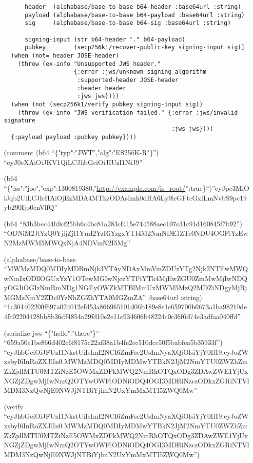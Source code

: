 \documentclass[
]{article}
\begin{document}
\begin{verbatim}
      header  (alphabase/base-to-base b64-header :base64url :string) 
      payload (alphabase/base-to-base b64-payload :base64url :string) 
      sig     (alphabase/base-to-base b64-sig :base64url :string) 

      signing-input (str b64-header "." b64-payload) 
      pubkey        (secp256k1/recover-public-key signing-input sig)] 
  (when (not= header JOSE-header) 
    (throw (ex-info "Unsupported JWS header." 
                    {:error :jws/unknown-signing-algorithm 
                     :supported-header JOSE-header 
                     :header header 
                     :jws jws}))) 
  (when (not (secp256k1/verify pubkey signing-input sig)) 
    (throw (ex-info "JWS verification failed." {:error :jws/invalid-signature 
                                                :jws jws}))) 
  {:payload payload :pubkey pubkey}))) 
\end{verbatim}

(comment (b64 ``\{"typ":"JWT","alg":"ES256K-R"\}'')
``eyJ0eXAiOiJKV1QiLCJhbGciOiJIUzI1NiJ9''

(b64
``\{"iss":"joe","exp":1300819380,"\url{http://example.com/is_root/}'':true\}``)''eyJpc3MiOiJqb2UiLCJleHAiOjEzMDA4MTkzODAsImh0dHA6Ly9leGFtcGxlLmNvbS9pc19yb290Ijp0cnVlfQ''

(b64
``83b3bec44b9cf25bb6c4bc81a283cf415e744588aec107c31c91d160845f7b92'')
``ODNiM2JlYzQ0YjljZjI1YmI2YzRiYzgxYTI4M2NmNDE1ZTc0NDU4OGFlYzEwN2MzMWM5MWQxNjA4NDVmN2I5Mg''

(alphabase/base-to-base
``MWMzMDQ0MDIyMDBmNjk3YTAyNDAxMmVmZDUzYTg2Njk2NTEwMWQwNmIxODllOGUxYzY1OTcwMGIwNjczYTFiYTk4MjEwZGU0ZmMwMjIwNDQyOGJiOGIzNmRmNDg1NGEyOWZkMTBlMmUxMWM5MzQ2MDZiNDgyMjRjMGMzNmY2ZDc0YzNhZGZhYTA0MGZmZA''
:base64url :string)
``1c304402200f697a024012efd53a866965101d06b189e8e1c659700b0673a1ba98210de4fc02204428bb8b36df4854a29fd10e2e11c934606b48224c0c36f6d74c3adfaa040ffd''

(serialize-jws ``\{"hello":"there"\}''
``659a50e1be866d402c6f8175c22af38a1b4fe2ec510dcc50f5babfea5b35933f'')
``eyJhbGciOiJFUzI1NkstUiIsImI2NCI6ZmFsc2UsImNyaXQiOlsiYjY0Il19.eyJoZWxsbyI6InRoZXJlIn0.MWMzMDQ0MDIyMDMwYTBkN2JjM2NmYTU0ZWZhZmZkZjdlMTU0MTZiNzE5OWMxZDFkMWQ2NmRhOTQxODg3ZDAwZWE1YjUxNGZjZDgwMjIwNmQ2OTYwOWFlODNiODQ4OGI3MDRiNzczODkxZGRiNTVlMDM3NzQwNjE0NWJjNTBiYjlmN2UxYmMxMTI5ZWQ0Mw''

(verify
``eyJhbGciOiJFUzI1NkstUiIsImI2NCI6ZmFsc2UsImNyaXQiOlsiYjY0Il19.eyJoZWxsbyI6InRoZXJlIn0.MWMzMDQ0MDIyMDMwYTBkN2JjM2NmYTU0ZWZhZmZkZjdlMTU0MTZiNzE5OWMxZDFkMWQ2NmRhOTQxODg3ZDAwZWE1YjUxNGZjZDgwMjIwNmQ2OTYwOWFlODNiODQ4OGI3MDRiNzczODkxZGRiNTVlMDM3NzQwNjE0NWJjNTBiYjlmN2UxYmMxMTI5ZWQ0Mw'')
\end{document}
